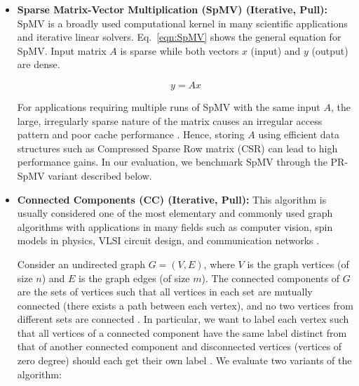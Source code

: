 \documentclass[sigconf, nonacm]{acmart}
\begin{document}
\begin{itemize}[topsep=2pt,itemsep=2pt,wide]
The Bellman–Ford algorithm \cite{bellman_routing_1958,ford_jr_network_1956} is one of the major algorithms to solve the SSSP problem. It follows a \emph{relaxation} approach, in which an approximation (overestimate) of the shortest path between the source $v$ and any vertex $u$ is iteratively replaced by better (shorter) ones until the last iteration of the algorithm. 

The algorithm initializes the distance to source $v$ to 0 and to all other destinations to infinity. The algorithm runs for $(n-1)$ iterations, where $n$ is the number of vertices in the graph. At each iteration, the algorithm visits all graph edges. If the distance to a destination can be shortened by taking the edge, the algorithm updates it to the new lower value. At each iteration $i$, the algorithm finds all shortest paths of at most $i$ edges. Since the longest possible path can at most be $(n-1)$ edges away, the algorithm must scan the edges $(n-1)$ times to ensure the shortest path is found for all destinations.

\item \textbf{Sparse Matrix-Vector Multiplication (SpMV) (Iterative, Pull): }
SpMV is a broadly used computational kernel in many scientific applications and iterative linear solvers. Eq.~\ref{eqn:SpMV} shows the general equation for SpMV. Input matrix $A$ is sparse while both vectors $x$ (input) and $y$ (output) are dense.

\begin{equation}\label{eqn:SpMV}
	{
		y=Ax
	}
\end{equation}

For applications requiring multiple runs of SpMV with the same input $A$, the large, irregularly sparse nature of the matrix causes an irregular access pattern and poor cache performance \cite{akbudak_technical_2012}. Hence, storing $A$ using efficient data structures such as Compressed Sparse Row matrix (CSR) can lead to high performance gains. In our evaluation, we benchmark SpMV through the PR-SpMV variant described below.

\item \textbf{Connected Components (CC) (Iterative, Pull): }
This algorithm is usually considered one of the most elementary and commonly used graph algorithms with applications in many fields such as computer vision, spin models in physics, VLSI circuit design, and communication networks \cite{greiner_comparison_1994}.

Consider an undirected graph $G = (V,E)$, where $V$ is the graph vertices (of size $n$) and $E$ is the graph edges (of size $m$). The connected components of $G$ are the sets of vertices such that all vertices in each set are mutually connected (there exists a path between each vertex), and no two vertices from different sets are connected \cite{greiner_comparison_1994}. In particular, we want to label each vertex such that all vertices of a connected component have the same label distinct from that of another connected component and disconnected vertices (vertices of zero degree) should each get their own label \cite{beamer_gap_2017}. We evaluate two variants of the algorithm:


\end{itemize}
\end{document}
